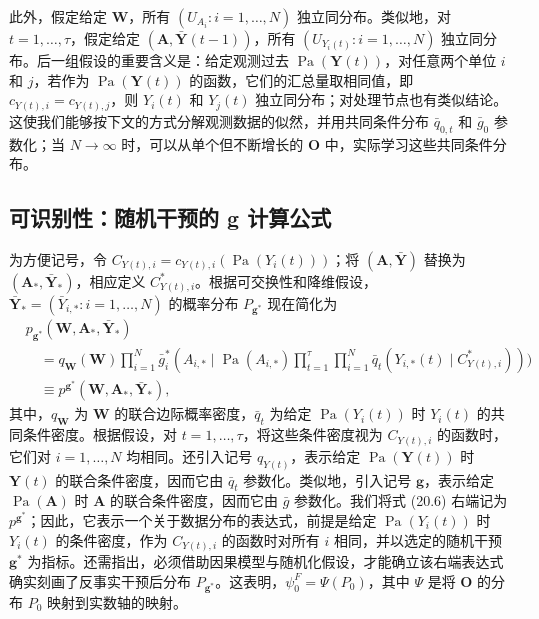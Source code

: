 此外，假定给定 $\mathbf W$，所有 $(U_{A_i}:i=1,\ldots,N)$ 独立同分布。类似地，对 $t=1,\ldots,\tau$，假定给定 $(\mathbf A,\bar{\mathbf Y}(t-1))$，所有 $(U_{Y_i(t)}:i=1,\ldots,N)$ 独立同分布。后一组假设的重要含义是：给定观测过去 $\operatorname{Pa}(\mathbf Y(t))$，对任意两个单位 $i$ 和 $j$，若作为 $\operatorname{Pa}(\mathbf Y(t))$ 的函数，它们的汇总量取相同值，即 $c_{Y(t),i}=c_{Y(t),j}$，则 $Y_i(t)$ 和 $Y_j(t)$ 独立同分布；对处理节点也有类似结论。这使我们能够按下文的方式分解观测数据的似然，并用共同条件分布 $\bar q_{0,t}$ 和 $\bar g_0$ 参数化；当 $N\to\infty$ 时，可以从单个但不断增长的 $\mathbf O$ 中，实际学习这些共同条件分布。

\subsection{可识别性：随机干预的 g 计算公式}

为方便记号，令 $C_{Y(t),i}=c_{Y(t),i}(\operatorname{Pa}(Y_i(t)))$；将 $(\mathbf A,\bar{\mathbf Y})$ 替换为 $(\mathbf A_*,\bar{\mathbf Y}_*)$，相应定义 $C_{Y(t),i}^*$。根据可交换性和降维假设，$\bar{\mathbf Y}_*=(\bar Y_{i,*}:i=1,\ldots,N)$ 的概率分布 $P_{\mathbf g^*}$ 现在简化为
\begin{equation}
\begin{aligned}
 &p_{\mathbf g^*}(\mathbf W,\mathbf A_*,\bar{\mathbf Y}_*)\\
 &\quad=q_{\mathbf W}(\mathbf W)\prod_{i=1}^N
 \bar g_i^*(A_{i,*}\mid\operatorname{Pa}(A_{i,*})
 \prod_{t=1}^\tau\prod_{i=1}^N
 \bar q_t(Y_{i,*}(t)\mid C_{Y(t),i}^*)))\\
 &\quad\equiv p^{\mathbf g^*}(\mathbf W,\mathbf A_*,\bar{\mathbf Y}_*),
\end{aligned}
\tag{20.6}
\end{equation}
其中，$q_{\mathbf W}$ 为 $\mathbf W$ 的联合边际概率密度，$\bar q_t$ 为给定 $\operatorname{Pa}(Y_i(t))$ 时 $Y_i(t)$ 的共同条件密度。根据假设，对 $t=1,\ldots,\tau$，将这些条件密度视为 $C_{Y(t),i}$ 的函数时，它们对 $i=1,\ldots,N$ 均相同。还引入记号 $q_{Y(t)}$，表示给定 $\operatorname{Pa}(\mathbf Y(t))$ 时 $\mathbf Y(t)$ 的联合条件密度，因而它由 $\bar q_t$ 参数化。类似地，引入记号 $\mathbf g$，表示给定 $\operatorname{Pa}(\mathbf A)$ 时 $\mathbf A$ 的联合条件密度，因而它由 $\bar g$ 参数化。我们将式 (20.6) 右端记为 $p^{\mathbf g^*}$；因此，它表示一个关于数据分布的表达式，前提是给定 $\operatorname{Pa}(Y_i(t))$ 时 $Y_i(t)$ 的条件密度，作为 $C_{Y(t),i}$ 的函数时对所有 $i$ 相同，并以选定的随机干预 $\mathbf g^*$ 为指标。还需指出，必须借助因果模型与随机化假设，才能确立该右端表达式确实刻画了反事实干预后分布 $P_{\mathbf g^*}$。这表明，$\psi_0^F=\Psi(P_0)$，其中 $\Psi$ 是将 $\mathbf O$ 的分布 $P_0$ 映射到实数轴的映射。

